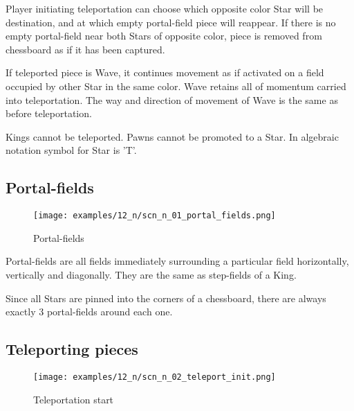 Player initiating teleportation can choose which opposite color Star will be destination,
and at which empty portal-field piece will reappear. If there is no empty portal-field near
both Stars of opposite color, piece is removed from chessboard as if it has been captured.

If teleported piece is Wave, it continues movement as if activated on a field occupied by
other Star in the same color. Wave retains all of momentum carried into teleportation.
The way and direction of movement of Wave is the same as before teleportation.

Kings cannot be teleported.
Pawns cannot be promoted to a Star.
In algebraic notation symbol for Star is 'T'.

\clearpage %

\subsection*{Portal-fields}

\noindent
\begin{figure}[!h]
\texttt{[image: examples/12\_n/scn\_n\_01\_portal\_fields.png]}
\caption{Portal-fields}
\label{fig:scn_n_01_portal_fields}
\end{figure}

Portal-fields are all fields immediately surrounding a particular field
horizontally, vertically and diagonally. They are the same as step-fields
of a King.

Since all Stars are pinned into the corners of a chessboard, there are always
exactly 3 portal-fields around each one.

\clearpage %

\subsection*{Teleporting pieces}

\noindent
\begin{figure}[!h]
\texttt{[image: examples/12\_n/scn\_n\_02\_teleport\_init.png]}
\caption{Teleportation start}
\label{fig:scn_n_02_teleport_init}
\end{figure}

